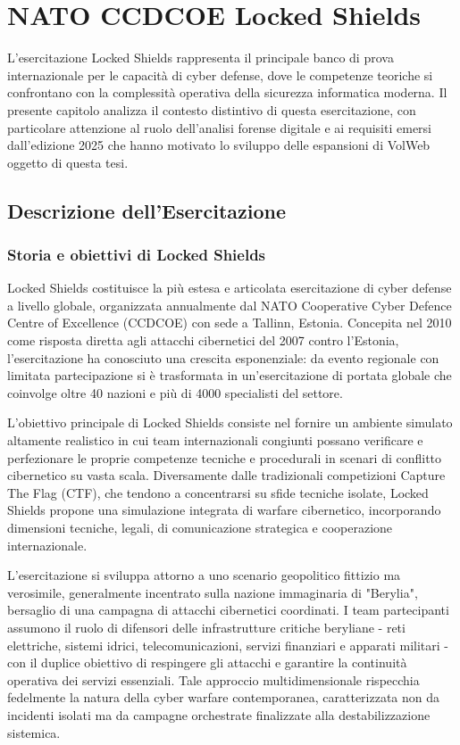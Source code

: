 \chapter{NATO CCDCOE Locked Shields}

L'esercitazione Locked Shields \cite{ccdcoe2025} rappresenta il principale banco di prova internazionale per le capacità di cyber defense, dove le competenze teoriche si confrontano con la complessità operativa della sicurezza informatica moderna. Il presente capitolo analizza il contesto distintivo di questa esercitazione, con particolare attenzione al ruolo dell'analisi forense digitale e ai requisiti emersi dall'edizione 2025 che hanno motivato lo sviluppo delle espansioni di VolWeb oggetto di questa tesi.

\section{Descrizione dell'Esercitazione}

\subsection{Storia e obiettivi di Locked Shields}

Locked Shields costituisce la più estesa e articolata esercitazione di cyber defense a livello globale, organizzata annualmente dal NATO Cooperative Cyber Defence Centre of Excellence (CCDCOE) con sede a Tallinn, Estonia. Concepita nel 2010 come risposta diretta agli attacchi cibernetici del 2007 contro l'Estonia, l'esercitazione ha conosciuto una crescita esponenziale: da evento regionale con limitata partecipazione si è trasformata in un'esercitazione di portata globale che coinvolge oltre 40 nazioni e più di 4000 specialisti del settore.

L'obiettivo principale di Locked Shields consiste nel fornire un ambiente simulato altamente realistico in cui team internazionali congiunti possano verificare e perfezionare le proprie competenze tecniche e procedurali in scenari di conflitto cibernetico su vasta scala. Diversamente dalle tradizionali competizioni Capture The Flag (CTF), che tendono a concentrarsi su sfide tecniche isolate, Locked Shields propone una simulazione integrata di warfare cibernetico, incorporando dimensioni tecniche, legali, di comunicazione strategica e cooperazione internazionale.

L'esercitazione si sviluppa attorno a uno scenario geopolitico fittizio ma verosimile, generalmente incentrato sulla nazione immaginaria di "Berylia", bersaglio di una campagna di attacchi cibernetici coordinati. I team partecipanti assumono il ruolo di difensori delle infrastrutture critiche beryliane - reti elettriche, sistemi idrici, telecomunicazioni, servizi finanziari e apparati militari - con il duplice obiettivo di respingere gli attacchi e garantire la continuità operativa dei servizi essenziali. Tale approccio multidimensionale rispecchia fedelmente la natura della cyber warfare contemporanea, caratterizzata non da incidenti isolati ma da campagne orchestrate finalizzate alla destabilizzazione sistemica.

